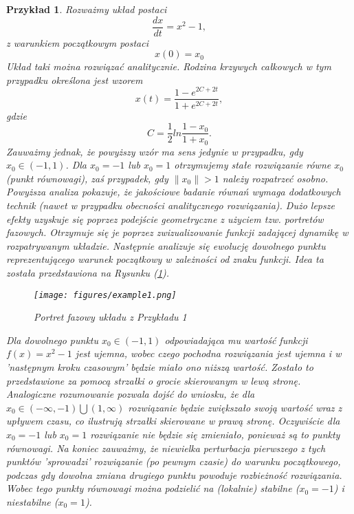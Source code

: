 \documentclass[12pt, twoside]{book}
\newtheorem{przyklad}{Przykład}
\begin{document}
\begin{przyklad}\label{przyklad1}
	Rozważmy układ postaci
	\begin{equation}
	\frac{dx}{dt} = x^2-1,
	\end{equation}
	z warunkiem początkowym postaci
	\begin{equation}
	x(0) = x_{0}
	\end{equation}
	Układ taki można rozwiązać analitycznie. Rodzina krzywych całkowych w tym przypadku określona jest wzorem
	\begin{equation}
	x(t) = \frac{1 - e^{2C + 2t}}{1 + e^{2C + 2t}},
	\end{equation}
	gdzie
	\begin{equation}
	C = \frac{1}{2}ln\frac{1-x_{0}}{1+x_{0}}.
	\end{equation}	
	Zauważmy jednak, że powyższy wzór ma sens jedynie w przypadku, gdy $ x_{0} \in (-1,1) $. Dla $ x_{0} = -1 $ lub $ x_{0} = 1 $ otrzymujemy stałe rozwiązanie równe $ x_{0} $ (punkt równowagi), zaś przypadek, gdy $ \| {x_{0}}\| > 1 $ należy rozpatrzeć osobno.\newline 
	Powyższa analiza pokazuje, że jakościowe badanie równań wymaga dodatkowych technik (nawet w przypadku obecności analitycznego rozwiązania). Dużo lepsze efekty uzyskuje się poprzez podejście geometryczne z użyciem tzw. \textit{portretów fazowych}. Otrzymuje się je poprzez zwizualizowanie funkcji zadającej dynamikę w rozpatrywanym układzie. Następnie analizuje się ewolucję dowolnego punktu reprezentującego warunek początkowy w zależności od znaku funkcji. Idea ta została przedstawiona na Rysunku (\ref{Fig4}).
	\begin{figure}[H]
		\texttt{[image: figures/example1.png]} 
		\centering
		\caption{Portret fazowy układu z Przykładu 1}
		\label{Fig4}
	\end{figure}
	Dla dowolnego punktu $ x_{0} \in (-1,1) $ odpowiadająca mu wartość funkcji $ f(x) = x^2-1 $ jest ujemna, wobec czego pochodna rozwiązania jest ujemna i w 'następnym kroku czasowym' będzie miało ono niższą wartość. Zostało to przedstawione za pomocą strzałki o grocie skierowanym w lewą stronę. Analogiczne rozumowanie pozwala dojść do wniosku, że dla $ x_{0} \in (-\infty,-1) \bigcup (1,\infty)$ rozwiązanie będzie zwiększało swoją wartość wraz z upływem czasu, co ilustrują strzałki skierowane w prawą stronę. Oczywiście dla  $ x_{0} = -1 $ lub $ x_{0} = 1 $ rozwiązanie nie będzie się zmieniało, ponieważ są to punkty równowagi. Na koniec zauważmy, że niewielka perturbacja pierwszego z tych punktów 'sprowadzi' rozwiązanie (po pewnym czasie) do warunku początkowego, podczas gdy dowolna zmiana drugiego punktu powoduje rozbieżność rozwiązania. Wobec tego punkty równowagi można podzielić na (lokalnie) stabilne ($ x_{0} = -1 $) i niestabilne ($ x_{0} = 1 $).
\end{przyklad}
\end{document}
